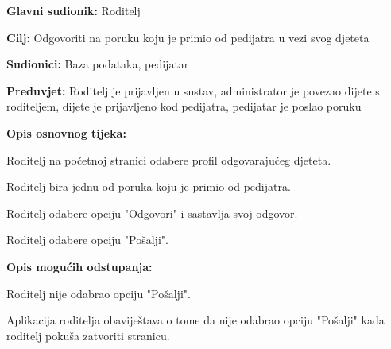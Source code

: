 						\noindent {}
					\begin{packed_item}
						
						\item \textbf{Glavni sudionik: }Roditelj
						\item  \textbf{Cilj:} Odgovoriti na poruku koju je primio od pedijatra u vezi svog djeteta
						\item  \textbf{Sudionici:} Baza podataka, pedijatar
						\item  \textbf{Preduvjet:} Roditelj je prijavljen u sustav, administrator je povezao dijete s roditeljem, dijete je prijavljeno kod pedijatra, pedijatar je poslao poruku
						\item  \textbf{Opis osnovnog tijeka:}
						
						\item[] \begin{packed_enum}
							
							\item Roditelj na početnoj stranici odabere profil odgovarajućeg djeteta.
							\item Roditelj bira jednu od poruka koju je primio od pedijatra.
							\item Roditelj odabere opciju "Odgovori" i sastavlja svoj odgovor.
							\item Roditelj odabere opciju "Pošalji".
						\end{packed_enum}
						
						\item  \textbf{Opis mogućih odstupanja:}
						
						\item[] \begin{packed_item}
							
							\item[4.a] Roditelj nije odabrao opciju "Pošalji".
							\item[] \begin{packed_enum}
								
								\item Aplikacija roditelja obaviještava o tome da nije odabrao opciju "Pošalji" kada roditelj pokuša zatvoriti stranicu.
							\end{packed_enum}
							
							
						\end{packed_item}
						
						
					\end{packed_item}
					
